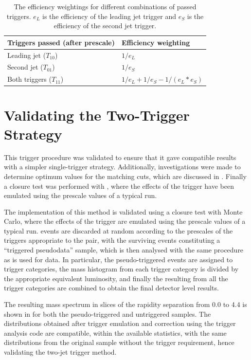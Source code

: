 \begin{table}
\begin{center}
  \begin{tabular}{ l l }
    Triggers passed (after prescale) & Efficiency weighting          \\
    \midrule
    Leading jet ($T_{10}$)           & $1/e_L$                       \\
    Second jet ($T_{01}$)            & $1/e_S$                       \\
    Both triggers ($T_{11}$)         & $1/e_L + 1/e_S - 1/(e_L*e_S)$ \\
   \end{tabular}
  \caption{The efficiency weightings for different combinations of passed triggers.
           $e_L$ is the efficiency of the leading jet trigger and $e_S$ is the efficiency
           of the second jet trigger.}
  \label{tab:dijets:efficiency_correction}
\end{center}
\end{table}

\section{Validating the Two-Trigger Strategy}
This trigger procedure was validated to ensure that it gave compatible results with
a simpler single-trigger strategy. Additionally, investigations were made to determine
optimum values for the matching cuts, which are discussed in .
Finally a closure test was performed with \MC, where the effects of the trigger
have been emulated using the prescale values of a typical run.

The implementation of this method is validated using a closure test with Monte
Carlo, where the effects of the trigger are emulated using the prescale values
of a typical run. \MC events are discarded at random according to the prescales
of the triggers appropriate to the \dijet pair, with the surviving events constituting
a ``triggered pseudodata'' sample, which is then analysed with the same procedure as is used
for data. In particular, the pseudo-triggered events are assigned to trigger categories, the
\dijet mass histogram from each trigger category is divided by the appropriate
equivalent luminosity, and finally the resulting  from all the trigger categories
are combined to obtain the final detector level results.

The resulting \dijet mass spectrum in slices of the rapidity separation \yStar from
0.0 to 4.4 is shown in  for both the pseudo-triggered and untriggered
\MC samples. The distributions obtained after trigger emulation and correction using the trigger
analysis code are compatible, within the available statistics, with the same distributions from the original
\MC sample without the trigger requirement, hence validating the two-jet trigger method.

